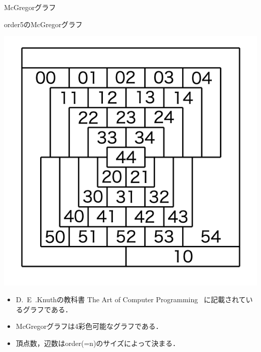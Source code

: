 \documentclass[dvipdfmx,11pt]{beamer}
\begin{document}
\begin{frame}{McGregorグラフ}
 \begin{exampleblock}{order5のMcGregorグラフ}
  \begin{center}
   \includegraphics[scale=0.2]{fig/order5.png}
  \end{center}
 \end{exampleblock}

 \begin{itemize}
  \item D.~E~.Knuthの教科書
         The Art of Computer Programming~\cite{Knuth:TAOCP:SAT}
         に記載されているグラフである．
  \item McGregorグラフは4彩色可能なグラフである．
  \item 頂点数，辺数はorder(=n)のサイズによって決まる．
 \end{itemize}
 
\end{frame}

\end{document}
